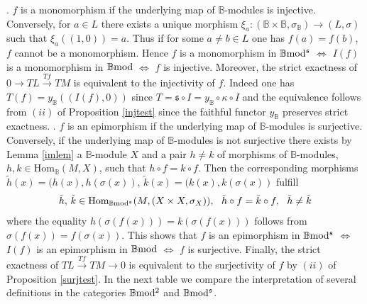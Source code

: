 \documentclass[12pt]{article}
\def\Hom{{\rm Hom}}
\def\B{{\mathbb B}}
\def\strg{strict }
\def\Hom {{\mbox{Hom}}}
\def\yb{\mathfrak{s}}
\def\bmod{{\rm \B mod}}
\def\bm2{{\rm \B mod^2}}
\def\b2{{\rm \B mod^{\mathfrak s}}}
\begin{document}
. $f$ is a monomorphism if the underlying map of $\B$-modules is injective. Conversely, for $a\in L$ there exists a unique morphism $\xi_a:(\B\times \B,\sigma_\B)\to (L,\sigma)$ such that $\xi_a((1,0))=a$. Thus if for some $a\neq b\in L$ one has $f(a)=f(b)$, $f$ cannot be a monomorphism. Hence  $f$ is a monomorphism in $\b2$ $\Leftrightarrow$ $I(f)$ is a monomorphism in $\bmod$ $\Leftrightarrow$ $f$ is injective. Moreover, the \strg exactness of $0 \to TL\stackrel{Tf}{\to}TM$ is equivalent to the injectivity of $f$.  Indeed one has $T(f)=y_\B((I(f),0))$ since $T=\yb\circ I=y_\B\circ \kappa\circ I$ and the equivalence follows from $(ii)$ of Proposition \ref{injtest} since the faithful functor $y_\B$ preserves \strg exactness. . $f$ is an epimorphism if the underlying map of $\B$-modules is surjective. Conversely, if the underlying map of $\B$-modules is not surjective there exists by Lemma \ref{imlem} a $\B$-module $X$ and a pair $h\neq k$ of morphisms of $\B$-modules, $h,k\in \Hom_\B(M,X)$, such that $h\circ f=k\circ f$.  Then the corresponding morphisms $\tilde h(x)=(h(x),h(\sigma(x))$, $\tilde k(x)=(k(x),k(\sigma(x))$ fulfill 
$$
\tilde h,\, \tilde k\in \Hom_\b2(M,(X\times X,\sigma_X)), \ \ \tilde h\circ f=\tilde k\circ f, \ \ \tilde h\neq \tilde k
$$
where the equality $h(\sigma(f(x)))=k(\sigma(f(x)))$ follows from $\sigma(f(x))=f(\sigma(x))$. This shows that $f$ is an epimorphism in $\b2$ $\Leftrightarrow$ $I(f)$ is an epimorphism in $\bmod$ $\Leftrightarrow$ $f$ is surjective. Finally, the \strg exactness of $TL\stackrel{Tf}{\to}TM\to 0$ is equivalent to the surjectivity of $f$ by $(ii)$ of Proposition \ref{surjtest}. \endproof
In the next table we compare the interpretation of several definitions in the categories $\bm2$ and $\b2$.
\end{document}
